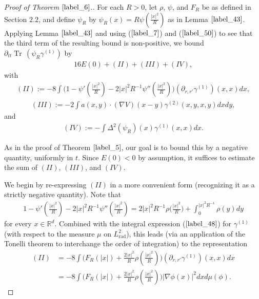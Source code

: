 \documentclass[reqno]{amsart}
\numberwithin{equation}{section}
\theoremstyle{remark}
\DeclareMathOperator{\Tr}{Tr\,}
\DeclareMathOperator{\rad}{rad}
\begin{document}
\begin{proof}[Proof of Theorem $\ref{label_6}$.]
For each $R>0$, let $\rho$, $\psi$, and $F_R$ be as defined in Section $2.2$, and define $\psi_R$ by $\psi_R(x)=R\psi(\frac{|x|^2}{R})$ as in Lemma $\ref{label_43}$.  Applying Lemma $\ref{label_43}$ and using ($\ref{label_7}$) and ($\ref{label_50}$) to see that the third term of the resulting bound is non-positive, we bound $\partial_{tt}\Tr(\psi_R\gamma^{(1)})$ by 
\begin{align}
16 E(0)+(II)+(III)+(IV),\label{label_51}
\end{align}
with
\begin{align*}
(II):=-8\int\bigg(1-\psi'(\frac{|x|^2}{R})-2|x|^2R^{-1}\psi''(\frac{|x|^2}{R})\bigg) (\partial_{r,r'}\gamma^{(1)})(x,x)dx,
\end{align*}
\begin{align*}
(III):=-2\int a(x,y)\cdot (\nabla V)(x-y)\gamma^{(2)}(x,y,x,y)dxdy,
\end{align*}
and
\begin{align*}
(IV):=-\int\Delta^2(\psi_R)(x)\gamma^{(1)}(x,x)dx.
\end{align*}

As in the proof of Theorem $\ref{label_5}$, our goal is to bound this by a negative quantity, uniformly in $t$.  Since $E(0)<0$ by assumption, it suffices to estimate the sum of $(II)$, $(III)$, and $(IV)$.  

We begin by re-expressing $(II)$ in a more convenient form (recognizing it as a strictly negative quantity).  Note that
\begin{align*}
1-\psi'(\frac{|x|^2}{R})-2|x|^2R^{-1}\psi''(\frac{|x|^2}{R})=2|x|^2R^{-1}\rho\bigg(\frac{|x|^2}{R}\bigg)+\int_0^{|x|^2R^{-1}} \rho(y)dy
\end{align*}
for every $x\in\mathbb{R}^d$.  Combined with the integral expression ($\ref{label_48}$) for $\gamma^{(1)}$ (with respect to the measure $\mu$ on $L^2_{\rad}$), this leads (via an application of the Tonelli theorem to interchange the order of integration) to the representation
\begin{align}
\nonumber (II)&=-8\int \bigg(F_R(|x|)+\frac{2|x|^2}{R}\rho(\frac{|x|^2}{R})\bigg)(\partial_{r,r'}\gamma^{(1)})(x,x)dx\\
&=-8\int \bigg(F_R(|x|)+\frac{2|x|^2}{R}\rho(\frac{|x|^2}{R})\bigg)|\nabla \phi(x)|^2dxd\mu(\phi).\label{label_52}
\end{align}


\end{proof}
\end{document}
